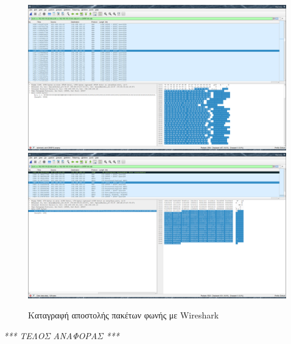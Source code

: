 \documentclass{article}
\begin{document}
\begin{figure}%
    \centering
    {\includegraphics[scale=0.1]{voice-stream.png}}
    {\includegraphics[scale=0.1]{voice-small-packets2.png}}
    \caption{Καταγραφή αποστολής πακέτων φωνής με Wireshark}
\end{figure}
\newpage
\centering
\emph{*** ΤΕΛΟΣ ΑΝΑΦΟΡΑΣ ***}
\end{document}
